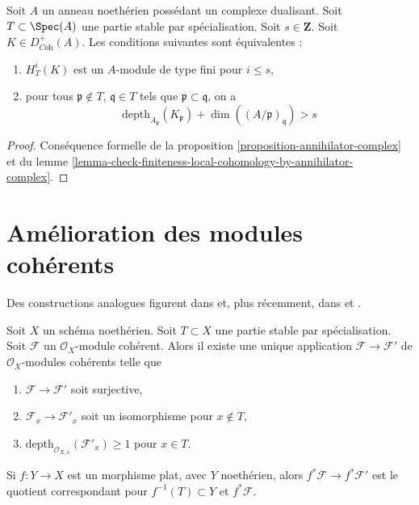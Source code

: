 \begin{proposition}
\label{proposition-finiteness-complex}
Soit $A$ un anneau noethérien possédant un complexe dualisant. Soit $T \subset \Spec(A)$ une partie stable par spécialisation. Soit $s \in \mathbf{Z}$. Soit $K \in D_{\textit{Coh}}^+(A)$. Les conditions suivantes sont équivalentes :
\begin{enumerate}
\item $H^i_T(K)$ est un $A$-module de type fini pour $i \leq s$,
\item pour tous $\mathfrak p \not \in T$, $\mathfrak q \in T$ tels que $\mathfrak p \subset \mathfrak q$, on a
$$
\text{depth}_{A_\mathfrak p}(K_\mathfrak p) +
\dim((A/\mathfrak p)_\mathfrak q) > s
$$
\end{enumerate}
\end{proposition}

\begin{proof}
Conséquence formelle de la proposition \ref{proposition-annihilator-complex} et du lemme \ref{lemma-check-finiteness-local-cohomology-by-annihilator-complex}.
\end{proof}






\section{Amélioration des modules cohérents}
\label{section-improve}

\noindent
Des constructions analogues figurent dans \cite{EGA} et, plus récemment, dans \cite{Kollar-local-global-hulls} et \cite{Kollar-variants}.

\begin{lemma}
\label{lemma-get-depth-1-along-Z}
Soit $X$ un schéma noethérien. Soit $T \subset X$ une partie stable par spécialisation. Soit $\mathcal{F}$ un $\mathcal{O}_X$-module cohérent. Alors il existe une unique application $\mathcal{F} \to \mathcal{F}'$ de $\mathcal{O}_X$-modules cohérents telle que
\begin{enumerate}
\item $\mathcal{F} \to \mathcal{F}'$ soit surjective,
\item $\mathcal{F}_x \to \mathcal{F}'_x$ soit un isomorphisme pour $x \not \in T$,
\item $\text{depth}_{\mathcal{O}_{X, x}}(\mathcal{F}'_x) \geq 1$ pour $x \in T$.
\end{enumerate}
Si $f : Y \to X$ est un morphisme plat, avec $Y$ noethérien, alors $f^*\mathcal{F} \to f^*\mathcal{F}'$ est le quotient correspondant pour $f^{-1}(T) \subset Y$ et $f^*\mathcal{F}$.
\end{lemma}

